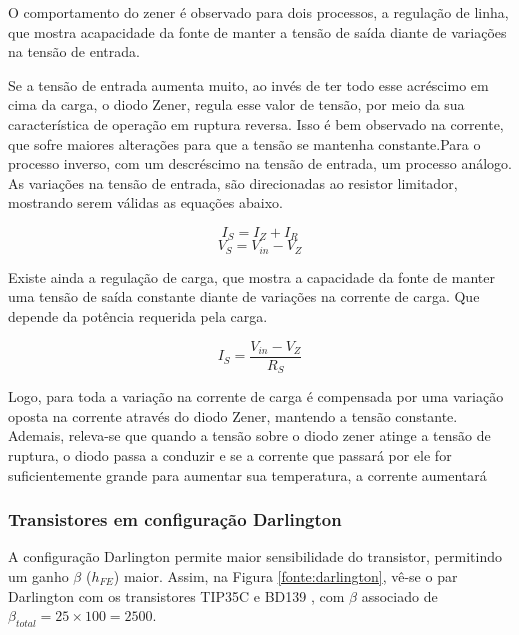 \documentclass[a4paper,12pt,oneside,openany,table,xcdraw]{article}
\begin{document}
O comportamento do zener é observado para dois processos, a regulação de linha, que mostra acapacidade da fonte de manter a tensão de saída diante de variações na tensão de entrada.

Se a tensão de entrada aumenta muito, ao invés de ter todo esse acréscimo em cima da carga, o diodo Zener, regula esse valor de tensão, por meio da sua característica de operação em ruptura reversa. Isso é bem observado na corrente, que sofre maiores alterações para que a tensão se mantenha constante.Para o processo inverso, com um descréscimo na tensão de entrada, um processo análogo. As variações na tensão de entrada, são direcionadas ao resistor limitador, mostrando serem válidas as equações abaixo.

\begin{equation}
I_{S}  = I_{Z} +I_{R}  
\end{equation}
\begin{equation}
V_{S}  = V_{in} - V_{Z}
\end{equation}

Existe ainda a  regulação de carga, que mostra a capacidade da fonte de manter uma tensão de saída constante diante de variações na corrente de carga. Que depende da potência requerida pela carga.

\begin{equation}
I_{S}  =\frac{ V_{in} - V_{Z}  }{R_{S}}
\end{equation}

Logo, para toda a variação na corrente de carga é compensada por uma variação oposta na corrente através do diodo Zener, mantendo a tensão constante.
Ademais, releva-se que quando a tensão sobre o diodo zener atinge a tensão de ruptura, o diodo passa a conduzir e se a corrente que passará por ele for suficientemente grande para aumentar sua temperatura, a corrente aumentará 

\vspace{0.2cm}
\subsubsection{Transistores em configuração Darlington}
A configuração Darlington permite maior sensibilidade do transistor, permitindo um ganho $\beta$ ($h_{FE}$) maior. Assim, na Figura \ref{fonte:darlington}, vê-se o par Darlington com os transistores TIP35C \cite{TIP35} e BD139 \cite{BD139}, com $\beta$ associado de $\beta_{total}=25\times 100=2500$.
\end{document}
